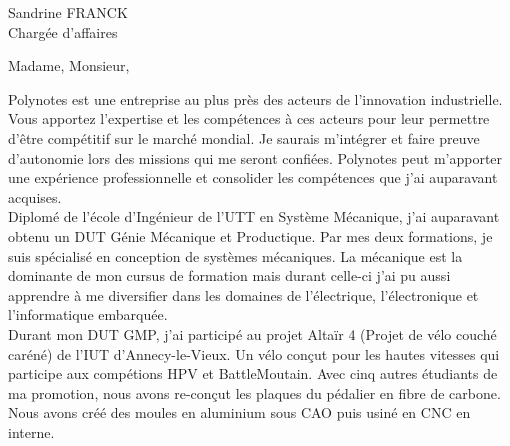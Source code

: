 \documentclass[a4paper,10pt,firstfoot=false]{scrlttr2}
\begin{document}


\begin{letter}{Sandrine FRANCK \\ Chargée d'affaires}

\pagestyle{empty}
\opening{Madame, Monsieur,}

Polynotes est une entreprise au plus près des acteurs de l'innovation industrielle. Vous apportez l'expertise et les compétences à ces acteurs pour leur permettre d'être compétitif sur le marché mondial. Je saurais m'intégrer et faire preuve d'autonomie lors des missions qui me seront confiées. Polynotes peut m'apporter une expérience professionnelle et consolider les compétences que j'ai auparavant acquises.\\

Diplomé de l’école d’Ingénieur de l’UTT en Système Mécanique, j’ai auparavant obtenu un DUT Génie Mécanique et Productique. Par mes deux formations, je suis spécialisé en conception de systèmes mécaniques. La mécanique est la dominante de mon cursus de formation mais durant celle-ci j’ai pu aussi apprendre à me diversifier dans les domaines de l’électrique, l’électronique et l’informatique embarquée.\\

Durant mon DUT GMP, j’ai participé au projet Altaïr 4 (Projet de vélo couché caréné) de l’IUT d’Annecy-le-Vieux. Un vélo conçut pour les hautes vitesses qui participe aux compétions HPV et BattleMoutain. Avec cinq autres étudiants de ma promotion, nous avons re-conçut les plaques du pédalier en fibre de carbone. Nous avons créé des moules en aluminium sous CAO puis usiné en CNC en interne.\\



\end{letter}
\end{document}

